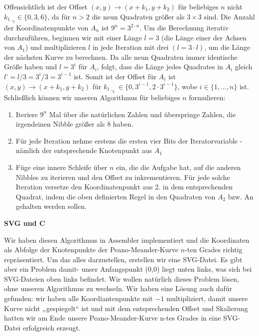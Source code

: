 \documentclass[course=erap]{aspdoc}
\begin{document}
Offensichtlich ist der Offset $(x,y) \to (x+k_1,y+k_2)$ für beliebiges $n$ nicht $k_1\,_,_2\in\{0,3,6\}$, da für $n>2$ die neun Quadraten größer als $3\times3$ sind. Die Anzahl der Koordinatenpunkte von $A_n$ ist $9^n=3^{2 \cdot n}$. Um die Berechnung iterativ durchzuführen, beginnen wir mit einer Länge $l=3$ (die Länge einer der Achsen von $A_1$) und multiplizieren $l$ in jede Iteration mit drei $(l=3 \cdot l)$, um die Länge der nächsten Kurve zu berechnen. Da alle neun Quadraten immer identische Größe haben und $l=3^i$ für $A_i$, folgt, dass die Länge jedes Quadrates in $A_i$ gleich $l$'$=l/3=3^i/3=3^{i-1}$ ist. Somit ist der Offset für $A_i$ ist $(x,y) \to (x+k_1,y+k_2)$ für $k_1\,_,_2\ \in \{0, 3^{i-1}, 2 \cdot 3
^{i-1}\}$, wobe $i \in \{1, \dots, n\}$ ist. Schließlich können wir unseren Algorithmus für beliebiges $n$ formulieren:
\begin{enumerate}
  \item Iteriere $9^n$ Mal über die natürlichen Zahlen und überspringe Zahlen, die irgendeinen Nibble größer als 8 haben.
  \item Für jede Iteration nehme erstens die ersten vier Bits der Iteratorvariable - nämlich der entsprechende Knotenpunkt aus $A_1$
  \item Füge eine innere Schleife über $n$ ein, die die Aufgabe hat, auf die anderen Nibbles zu iterieren und den Offset zu inkrementieren. Für jede solche Iteration versetze den Koordinatenpunkt aus 2. in dem entsprechenden Quadrat, indem die oben definierten Regel in den Quadraten von $A_2$ bzw. An gehalten werden sollen.   
\end{enumerate}

\large\textbf{SVG und C}\newline

Wir haben diesen Algorithmus in Assembler implementiert und die Koordinaten als Abfolge der Knotenpunkte der Peano-Meander-Kurve $n$-ten Grades richtig repräsentiert. Um das alles darzustellen, erstellen wir eine SVG-Datei. Es gibt aber ein Problem damit- unser Anfangspunkt (0,0) liegt unten links, was sich bei SVG-Dateien oben links befindet. Wir wollen natürlich dieses Problem lösen, ohne unseren Algorithmus zu wechseln.  Wir haben eine Lösung auch dafür gefunden: wir haben alle Koordiantenpunkte mit $-1$ multipliziert, damit unsere Kurve nicht „gespiegelt“ ist und mit dem entsprechenden Offset und Skalierung hatten wir am Ende unsere Peano-Meander-Kurve n-tes Grades in eine SVG-Datei erfolgreich erzeugt. 

\end{document}
